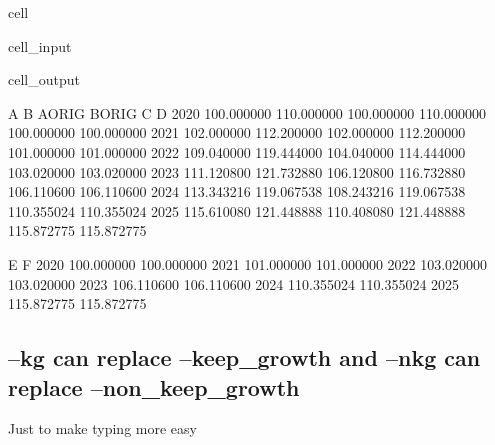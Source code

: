 \documentclass[letterpaper,10pt,english]{jupyterBook}
\begin{document}
\begin{sphinxuseclass}{cell}\begin{sphinxVerbatimInput}

\begin{sphinxuseclass}{cell_input}
\begin{sphinxVerbatim}[commandchars=\\\{\}]
  
\end{sphinxVerbatim}

\end{sphinxuseclass}\end{sphinxVerbatimInput}
\begin{sphinxVerbatimOutput}

\begin{sphinxuseclass}{cell_output}
\begin{sphinxVerbatim}[commandchars=\\\{\}]
               A           B      A\PYGZus{}ORIG      B\PYGZus{}ORIG           C           D  \PYGZbs{}
2020  100.000000  110.000000  100.000000  110.000000  100.000000  100.000000   
2021  102.000000  112.200000  102.000000  112.200000  101.000000  101.000000   
2022  109.040000  119.444000  104.040000  114.444000  103.020000  103.020000   
2023  111.120800  121.732880  106.120800  116.732880  106.110600  106.110600   
2024  113.343216  119.067538  108.243216  119.067538  110.355024  110.355024   
2025  115.610080  121.448888  110.408080  121.448888  115.872775  115.872775   

               E           F  
2020  100.000000  100.000000  
2021  101.000000  101.000000  
2022  103.020000  103.020000  
2023  106.110600  106.110600  
2024  110.355024  110.355024  
2025  115.872775  115.872775  
\end{sphinxVerbatim}

\end{sphinxuseclass}\end{sphinxVerbatimOutput}

\end{sphinxuseclass}

\subsection{–kg can replace –keep\_growth and –nkg can replace –non\_keep\_growth}
\label{\detokenize{content/04_PythonEssentials/UpdateCommand:kg-can-replace-keep-growth-and-nkg-can-replace-non-keep-growth}}
\sphinxAtStartPar
Just to make typing more easy
\end{document}

